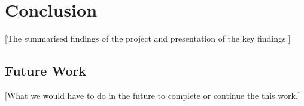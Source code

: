 \section{Conclusion}\label{conclusion}
[The summarised findings of the project and presentation of the key findings.]
    \subsection{Future Work}\label{future}
    [What we would have to do in the future to complete or continue the this work.]
